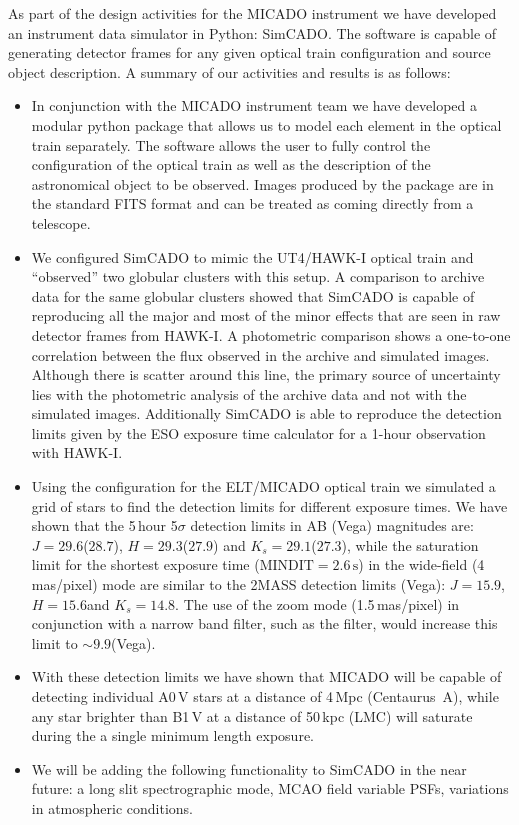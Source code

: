 As part of the design activities for the MICADO instrument we have developed an instrument data simulator in Python: SimCADO. The software is capable of generating detector frames for any given optical train configuration and source object description. A summary of our activities and results is as follows:

\begin{itemize}

    \item In conjunction with the MICADO instrument team we have developed a modular python package that allows us to model each element in the optical train separately. The software allows the user to fully control the configuration of the optical train as well as the description of the astronomical object to be observed. Images produced by the package are in the standard FITS format and can be treated as coming directly from a telescope.
    
    \item We configured SimCADO to mimic the UT4/HAWK-I optical train and ``observed'' two globular clusters with this setup. A comparison to archive data for the same globular clusters showed that SimCADO is capable of reproducing all the major and most of the minor effects that are seen in raw detector frames from HAWK-I. A photometric comparison shows a one-to-one correlation between the flux observed in the archive and simulated images. Although there is scatter around this line, the primary source of uncertainty lies with the photometric analysis of the archive data and not with the simulated images. Additionally SimCADO is able to reproduce the detection limits given by the ESO exposure time calculator for a 1-hour observation with HAWK-I.
    
    \item Using the configuration for the ELT/MICADO optical train we simulated a grid of stars to find the detection limits for different exposure times. We have shown that the 5\,hour 5$\sigma$ detection limits in AB (Vega) magnitudes are: $J=29.6$\m ($28.7$\m), $H=29.3$\m ($27.9$\m) and $K_{s}=29.1$\m ($27.3$\m), while the saturation limit for the shortest exposure time ($\mathrm{MINDIT}=2.6\,\mathrm{s}$) in the wide-field (4\,mas/pixel) mode are similar to the 2MASS detection limits (Vega): $J=15.9$\m, $H=15.6$\m and $K_{s}=14.8$\m. The use of the zoom mode (1.5\,mas/pixel) in conjunction with a narrow band filter, such as the \brgamma filter, would increase this limit to $\sim 9.9$\m (Vega).

    \item With these detection limits we have shown that MICADO will be capable of detecting individual A0\,V stars at a distance of 4\,Mpc (Centaurus~A), while any star brighter than B1\,V at a distance of 50\,kpc (LMC) will saturate during the a single minimum length exposure.
    
    \item We will be adding the following functionality to SimCADO in the near future: a long slit spectrographic mode, MCAO field variable PSFs, variations in atmospheric conditions.

\end{itemize}

